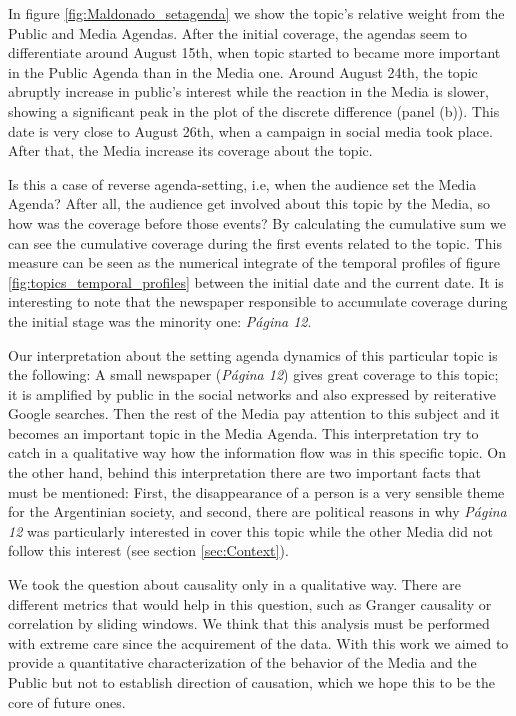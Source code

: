 \documentclass[10pt,letterpaper]{article}
\begin{document}
\par In figure \ref{fig:Maldonado_setagenda} we show the topic's relative weight from the Public and Media Agendas.  After the initial coverage, the agendas seem to differentiate around August 15th, when topic started to became more important in the Public Agenda than in the Media one. Around August 24th, the topic abruptly increase in public's interest while the reaction in the Media is slower, showing a significant peak in the plot of the discrete difference (panel (b)). This date is very close to August 26th, when a campaign in social media took place. After that, the Media increase its coverage about the topic. 

\par Is this a case of reverse agenda-setting, i.e, when the audience set the Media Agenda? 
After all,  the audience get involved about this topic by the Media, so how was the coverage before those events?
By calculating the cumulative sum we can see  the cumulative coverage during the first events related to the topic. 
This measure can be seen as the numerical integrate of the temporal profiles of figure \ref{fig:topics_temporal_profiles} between the initial date and the current date. 
It is interesting to note that the newspaper responsible to accumulate coverage during the initial stage was the minority one: \emph{P\'agina 12}. 

Our interpretation about the setting agenda dynamics of this particular topic is the following: A small newspaper (\emph{P\'agina 12}) gives great coverage to this topic; it is amplified  by public in the social networks and also expressed  by reiterative Google searches. Then the rest of the Media  pay attention to this subject and it becomes an important topic in the Media Agenda. 
This interpretation try to catch in a qualitative way how the information flow was in this specific topic.
On the other hand, behind this interpretation there are two important facts that must be mentioned: First, the disappearance of a person is a very sensible theme for the Argentinian society, and second, there are political reasons in why \emph{P\'agina 12} was particularly interested in cover this topic while the other Media did not follow this interest (see section \ref{sec:Context}).

\par We took the question about causality only in a qualitative way. 
There are different metrics that would help in this question, such as Granger causality or correlation by sliding windows. We think that this analysis must be performed with extreme care since the acquirement of the data.
With this work we aimed to provide a quantitative characterization of the behavior of the Media and the Public but not to establish direction of causation, which we hope this to be the core of future ones.
\end{document}

